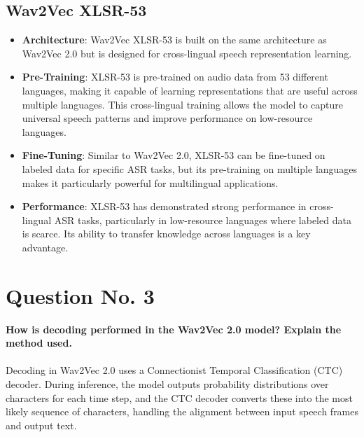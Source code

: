 \documentclass{article}
\begin{document}
\subsection*{Wav2Vec XLSR-53}
\begin{itemize}
  \item \textbf{Architecture}: Wav2Vec XLSR-53 is built on the same architecture as Wav2Vec 2.0 but is designed for cross-lingual speech representation learning.
  \item \textbf{Pre-Training}: XLSR-53 is pre-trained on audio data from 53 different languages, making it capable of learning representations that are useful across multiple languages. This cross-lingual training allows the model to capture universal speech patterns and improve performance on low-resource languages.
  \item \textbf{Fine-Tuning}: Similar to Wav2Vec 2.0, XLSR-53 can be fine-tuned on labeled data for specific ASR tasks, but its pre-training on multiple languages makes it particularly powerful for multilingual applications.
  \item \textbf{Performance}: XLSR-53 has demonstrated strong performance in cross-lingual ASR tasks, particularly in low-resource languages where labeled data is scarce. Its ability to transfer knowledge across languages is a key advantage.
\end{itemize}


\pagebreak

\section*{Question No. 3}
\textbf{How is decoding performed in the Wav2Vec 2.0 model? Explain the method used.}\\\\
Decoding in Wav2Vec 2.0 uses a Connectionist Temporal Classification (CTC) decoder. During inference, the model outputs probability distributions over characters for each time step, and the CTC decoder converts these into the most likely sequence of characters, handling the alignment between input speech frames and output text.
\end{document}
